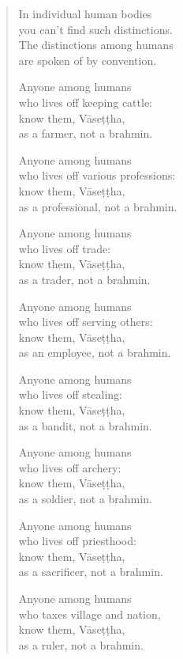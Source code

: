 \documentclass[12pt,openany]{book}%
\begin{document}
\begin{verse}
In individual human bodies \\
you can’t find such distinctions. \\
The distinctions among humans \\
are spoken of by convention. 

Anyone among humans \\
who lives off keeping cattle: \\
know them, \textsanskrit{Vāseṭṭha}, \\
as a farmer, not a brahmin. 

Anyone among humans \\
who lives off various professions: \\
know them, \textsanskrit{Vāseṭṭha}, \\
as a professional, not a brahmin. 

Anyone among humans \\
who lives off trade: \\
know them, \textsanskrit{Vāseṭṭha}, \\
as a trader, not a brahmin. 

Anyone among humans \\
who lives off serving others: \\
know them, \textsanskrit{Vāseṭṭha}, \\
as an employee, not a brahmin. 

Anyone among humans \\
who lives off stealing: \\
know them, \textsanskrit{Vāseṭṭha}, \\
as a bandit, not a brahmin. 

Anyone among humans \\
who lives off archery: \\
know them, \textsanskrit{Vāseṭṭha}, \\
as a soldier, not a brahmin. 

Anyone among humans \\
who lives off priesthood: \\
know them, \textsanskrit{Vāseṭṭha}, \\
as a sacrificer, not a brahmin. 

Anyone among humans \\
who taxes village and nation, \\
know them, \textsanskrit{Vāseṭṭha}, \\
as a ruler, not a brahmin. 


\end{verse}
\end{document}
